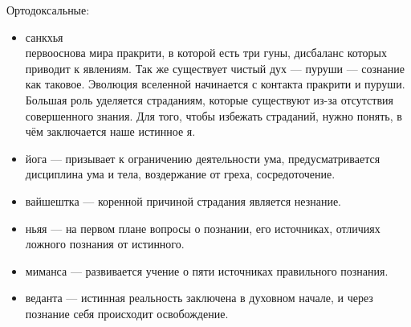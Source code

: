  Ортодоксальные:
 \begin{itemize}
    \item санкхья\\
    первооснова мира пракрити, в которой есть три гуны, дисбаланс которых приводит к явлениям. Так же существует чистый дух --- пуруши --- сознание как таковое. Эволюция вселенной начинается с контакта пракрити и пуруши. Большая роль уделяется страданиям, которые существуют из-за отсутствия совершенного знания. Для того, чтобы избежать страданий, нужно понять, в чём заключается наше истинное я.
    \item йога --- призывает к ограничению деятельности ума, предусматривается дисциплина ума и тела, воздержание от греха, сосредоточение.
    \item вайшештка --- коренной причиной страдания является незнание.
    \item ньяя --- на первом плане вопросы о познании, его источниках, отличиях ложного познания от истинного.
    \item миманса --- развивается учение о пяти источниках правильного познания.
    \item веданта --- истинная реальность заключена в духовном начале, и через познание себя происходит освобождение.
\end{itemize}